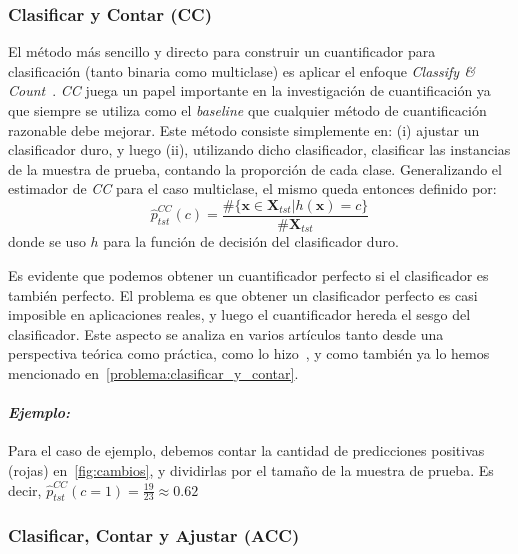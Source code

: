 \subsubsection{Clasificar y Contar (CC)}

El método más sencillo y directo para construir un cuantificador para
clasificación (tanto binaria como multiclase) es aplicar el enfoque {\it
Classify \& Count\/}~\cite{forman2005counting}. {\it CC\/} juega un papel
importante en la investigación de cuantificación ya que siempre se utiliza como
el {\it baseline\/} que cualquier método de cuantificación razonable debe
mejorar. Este método consiste simplemente en: (i) ajustar un clasificador duro,
y luego (ii), utilizando dicho clasificador, clasificar las instancias de la
muestra de prueba, contando la proporción de cada clase. Generalizando el
estimador de {\it CC\/} para el caso multiclase, el mismo queda entonces
definido por:
\begin{equation}
    \hat p^{CC}_{tst}(c) = \frac{\#\{\boldsymbol{x} \in \boldsymbol{X}_{tst}|h(\boldsymbol{x})=c\}}{\#\boldsymbol{X}_{tst}}\label{ecuacion:cc}
\end{equation}
donde se uso $h$ para la función de decisión del clasificador duro.

Es evidente que podemos obtener un cuantificador perfecto si el clasificador es
también perfecto. El problema es que obtener un clasificador perfecto es casi
imposible en aplicaciones reales, y luego el cuantificador hereda el sesgo del
clasificador. Este aspecto se analiza en varios artículos tanto desde una
perspectiva teórica como práctica, como lo
hizo~\citeauthor{forman2008quantifying}, y como también ya lo hemos mencionado
en~\ref{problema:clasificar_y_contar}.

\paragraph{\it Ejemplo:\/} Para el caso de ejemplo, debemos contar la cantidad
de predicciones positivas (rojas) en~\ref{fig:cambios}, y dividirlas por el
tamaño de la muestra de prueba. Es decir, $\hat p^{CC}_{tst}(c=1) =
\frac{19}{23} \approx 0.62$

\subsubsection{Clasificar, Contar y Ajustar (ACC)}

